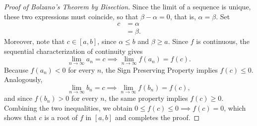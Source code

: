 \begin{proof}[Proof of Bolzano's Theorem by Bisection]
Since the limit of a sequence is unique, these two expressions must coincide, so that $\beta - \alpha = 0$, that is, $\alpha = \beta$. Set
\[
\begin{aligned}
c &= \alpha \\
&= \beta.
\end{aligned}
\]
Moreover, note that $c \in [a,b]$, since $\alpha \leq b$ and $\beta \geq a$. Since $f$ is continuous, the sequential characterization of continuity gives
\[
\lim_{n \to \infty} a_n = c \implies \lim_{n \to \infty} f(a_n) = f(c).
\]
Because $f(a_n) < 0$ for every $n$, the Sign Preserving Property implies $f(c) \leq 0$. Analogously, \[
\lim_{n \to \infty} b_n = c \implies \lim_{n \to \infty} f(b_n) = f(c),
\] and since $f(b_n) > 0$ for every $n$, the same property implies $f(c) \geq 0$. Combining the two inequalities, we obtain $0 \leq f(c) \leq 0 \implies f(c) = 0$, which shows that $c$ is a root of $f$ in $[a,b]$ and completes the proof.
\end{proof}
